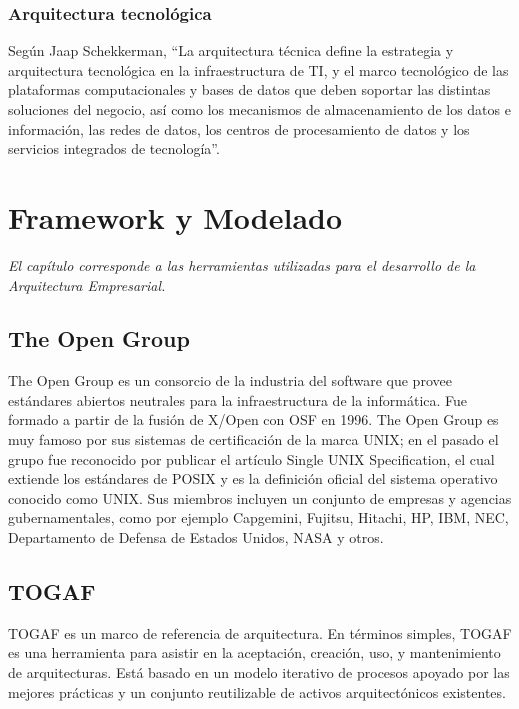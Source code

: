   \subsection{Arquitectura tecnológica}
  Según Jaap Schekkerman, “La arquitectura técnica define la estrategia y arquitectura tecnológica en la infraestructura de TI, y el marco tecnológico de las plataformas computacionales y bases de datos que deben soportar las distintas soluciones del negocio, así como los mecanismos de almacenamiento de los datos e información, las redes de datos, los centros de procesamiento de datos y los servicios integrados de tecnología”.
 
\chapter{Framework y Modelado}
\label{chap:Archimate}
\textit{El capítulo corresponde a las herramientas utilizadas para el desarrollo de la Arquitectura Empresarial.}
\vfill
\minitoc
\cleardoublepage

\section{The Open Group}
The Open Group es un consorcio de la industria del software que provee estándares abiertos neutrales para la infraestructura de la informática. Fue formado a partir de la fusión de X/Open con OSF en 1996. The Open Group es muy famoso por sus sistemas de certificación de la marca UNIX; en el pasado el grupo fue reconocido por publicar el artículo Single UNIX Specification, el cual extiende los estándares de POSIX y es la definición oficial del sistema operativo conocido como UNIX. Sus miembros incluyen un conjunto de empresas y agencias gubernamentales, como por ejemplo Capgemini, Fujitsu, Hitachi, HP, IBM, NEC, Departamento de Defensa de Estados Unidos, NASA y otros. \cite{ref10}

\section{TOGAF}
TOGAF es un marco de referencia de arquitectura. En términos simples, TOGAF es una herramienta para asistir en la aceptación, creación, uso, y mantenimiento de arquitecturas. Está basado en un modelo iterativo de procesos apoyado por las mejores prácticas y un conjunto reutilizable de activos arquitectónicos existentes. \\

